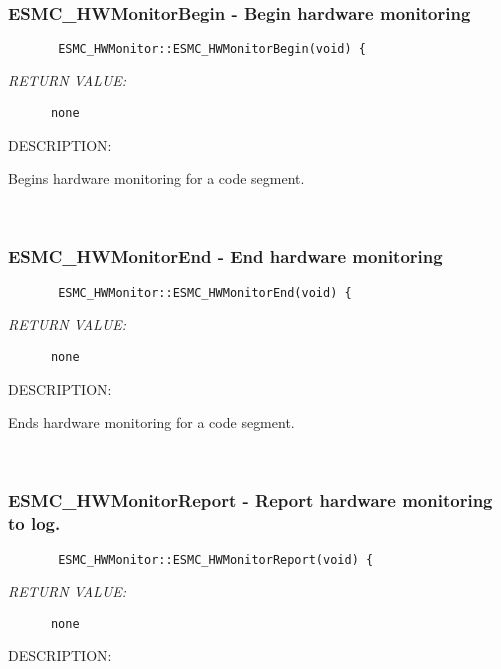  
\mbox{}\hrulefill\ 
 
\subsubsection{ESMC\_HWMonitorBegin - Begin hardware monitoring}


  
\begin{verbatim}       ESMC_HWMonitor::ESMC_HWMonitorBegin(void) {\end{verbatim}{\em RETURN VALUE:}
\begin{verbatim}      none\end{verbatim}
{\sf DESCRIPTION:\\ }


        Begins hardware monitoring for a code segment.
   
 
\mbox{}\hrulefill\ 
 
\subsubsection{ESMC\_HWMonitorEnd - End hardware monitoring}


  
\begin{verbatim}       ESMC_HWMonitor::ESMC_HWMonitorEnd(void) {\end{verbatim}{\em RETURN VALUE:}
\begin{verbatim}      none\end{verbatim}
{\sf DESCRIPTION:\\ }


        Ends hardware monitoring for a code segment.
   
 
\mbox{}\hrulefill\ 
 
\subsubsection{ESMC\_HWMonitorReport - Report hardware monitoring to log.}


  
\begin{verbatim}       ESMC_HWMonitor::ESMC_HWMonitorReport(void) {\end{verbatim}{\em RETURN VALUE:}
\begin{verbatim}      none\end{verbatim}
{\sf DESCRIPTION:\\ }


